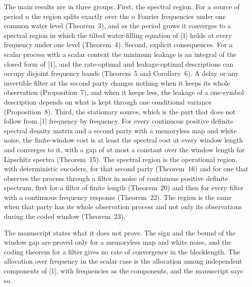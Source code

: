 \documentclass[11pt]{article}
\begin{document}
The main results are in three groups. First, the spectral region. For a
source of period $n$ the region splits exactly over the $n$ Fourier
frequencies under one common water level (Theorem~3), and as the period
grows it converges to a spectral region in which the tilted
water-filling equation of [1] holds at every frequency under one level
(Theorem~4). Second, explicit consequences. For a scalar process with a
scalar context the minimum leakage is an integral of the closed form of
[1], and the rate-optimal and leakage-optimal descriptions can occupy
disjoint frequency bands (Theorem~5 and Corollary~6). A delay or any
invertible filter at the second party changes nothing when it keeps its
whole observation (Proposition~7), and when it keeps less, the leakage
of a one-symbol description depends on what is kept through one
conditional variance (Proposition~8). Third, the stationary source,
which is the part that does not follow from [1] frequency by frequency.
For every continuous positive definite spectral density matrix and a
second party with a memoryless map and white noise, the finite-window
cost is at least the spectral cost at every window length and converges
to it, with a gap of at most a constant over the window length for
Lipschitz spectra (Theorem~15). The spectral region is the operational
region, with deterministic encoders, for that second party
(Theorem~16) and for one that observes the process through a filter in
noise of continuous positive definite spectrum, first for a filter of
finite length (Theorem~20) and then for every filter with a continuous
frequency response (Theorem~22). The region is the same when that
party has its whole observation process and not only its observations
during the coded window (Theorem~23).

The manuscript states what it does not prove. The sign and the bound
of the window gap are proved only for a memoryless map and white noise,
and the coding theorem for a filter gives no rate of convergence in the
blocklength.
The allocation over frequency in the scalar case is the allocation
among independent components of [1], with frequencies as the components,
and the manuscript says so.
\end{document}
